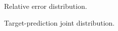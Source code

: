 \documentclass[10pt,a4paper,notitlepage,twocolumn]{article}
\begin{document}
\begin{figure}[!h]
\caption{Relative error distribution.}
\end{figure}


\begin{figure}
\centering
{}
\caption{Target-prediction joint distribution.}
\end{figure}
\end{document}
